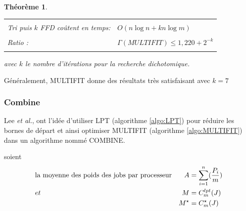 \documentclass[a4paper,12pt]{report}
\theoremstyle{plain}				%
\newtheorem{theoreme}{Théorème}	%
\theoremstyle{definition}				%
\newcommand{\tdi}[1]{\todo[inline]{{#1}}{}}
\newcommand{\lp}[1]{\todo[author=LP,color=yellow,inline]{#1}}
\begin{document}
\begin{theoreme}
\begin{flushleft}
\begin{tabular}{|p{8cm}p{6cm}|}
\hline
& \\
Tri puis $k$ FFD coûtent en temps: & $O(n \log n + kn \log m)$
\\	%
& \\
Ratio \cite{lee1988multiprocessor}:& $\Gamma(MULTIFIT) \leq 1,220 + 2^{-k}$
\\
& \\
\hline
\end{tabular}
\end{flushleft}
avec $k$ le nombre d'itérations pour la recherche dichotomique.
\end{theoreme}

Généralement, MULTIFIT donne des résultats très satisfaisant avec $k = 7$


\subsubsection{Combine}

Lee \emph{et al.}, \cite{lee1988multiprocessor} ont l'idée
d'utiliser LPT (algorithme \ref{algo:LPT}) pour réduire les bornes de départ
et ainsi optimiser MULTIFIT (algorithme \ref{algo:MULTIFIT}) dans un
algorithme nommé COMBINE.

\bigskip
soient
\begin{align*}
&\textnormal{la moyenne des poids des jobs par processeur} &A &= \sum_{i=1}^{n}(\frac{P_i}{m})\\
&et &M &= C_m^{lpt}(J) \\
& &M^\star &= C_m^\star(J)
\end{align*}
\end{document}
